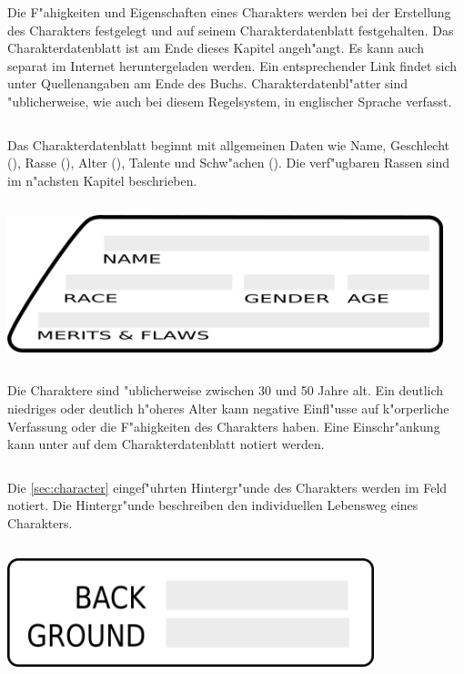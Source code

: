 
Die F"ahigkeiten und Eigenschaften eines Charakters werden bei der Erstellung des Charakters festgelegt und auf seinem Charakterdatenblatt festgehalten. Das Charakterdatenblatt ist am Ende dieses Kapitel angeh"angt. Es kann auch separat im Internet heruntergeladen werden. Ein entsprechender Link findet sich unter Quellenangaben am Ende des Buchs. Charakterdatenbl"atter sind "ublicherweise, wie auch bei diesem Regelsystem, in englischer Sprache verfasst.

\begin{column}[l]{0.48}
    Das Charakterdatenblatt beginnt mit allgemeinen Daten wie Name, Geschlecht (), Rasse (), Alter (), Talente und Schw"achen (). Die verf"ugbaren Rassen sind im n"achsten Kapitel beschrieben.
\end{column}
\begin{column}[r]{0.52}
    \centering
    \includegraphics[width=0.95\textwidth]{images/character_base_stats.png}
    \medskip   
\end{column}
\medskip


Die Charaktere sind "ublicherweise zwischen 30 und 50 Jahre alt. Ein deutlich niedriges oder deutlich h"oheres Alter kann negative Einfl"usse auf k"orperliche Verfassung oder die F"ahigkeiten des Charakters haben. Eine Einschr"ankung kann unter  auf dem Charakterdatenblatt notiert werden.


\begin{column}[l]{0.52}
    Die \cref{sec:character} eingef"uhrten Hintergr"unde des Charakters werden im Feld  notiert. Die Hintergr"unde beschreiben den individuellen Lebensweg eines Charakters.
\end{column}
\begin{column}[r]{0.48}
    \centering
    \includegraphics[width=0.80\textwidth]{images/character_background.png}    
\end{column}

